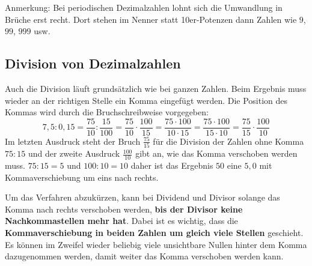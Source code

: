 Anmerkung: Bei periodischen Dezimalzahlen lohnt sich die Umwandlung in Brüche erst recht. Dort stehen im Nenner statt 10er-Potenzen dann Zahlen wie $9$, $99$, $999$ usw.



\subsection{Division von Dezimalzahlen}\vspace{-1em}
Auch die Division läuft grundsätzlich wie bei ganzen Zahlen. Beim Ergebnis muss wieder an der richtigen Stelle ein Komma eingefügt werden. Die Position des Kommas wird durch die Bruchschreibweise vorgegeben:
\begin{equation*}
	7{,}5:0{,}15 = \frac{75}{10}: \frac{15}{100} = \frac{75}{10}\cdot \frac{100}{15} = \frac{75\cdot 100}{10\cdot 15} =\frac{75\cdot 100}{15\cdot 10} = \frac{75}{15}\cdot \frac{100}{10}
\end{equation*}
Im letzten Ausdruck steht der Bruch $\frac{75}{15}$ für die Division der Zahlen ohne Komma $75:15$ und der zweite Ausdruck $\frac{100}{10}$ gibt an, wie das Komma verschoben werden muss. $75:15=5$ und $100:10=10$ daher ist das Ergebnis $50$ eine $5{,}0$ mit Kommaverschiebung um eins nach rechts.

%	

Um das Verfahren abzukürzen, kann bei Dividend und Divisor solange das Komma nach rechts verschoben werden, \textbf{bis der Divisor keine Nachkommastellen mehr hat}. Dabei ist es wichtig, dass die \textbf{Kommaverschiebung in beiden Zahlen um gleich viele Stellen} geschieht. Es können im Zweifel wieder beliebig viele unsichtbare Nullen hinter dem Komma dazugenommen werden, damit weiter das Komma verschoben werden kann.

